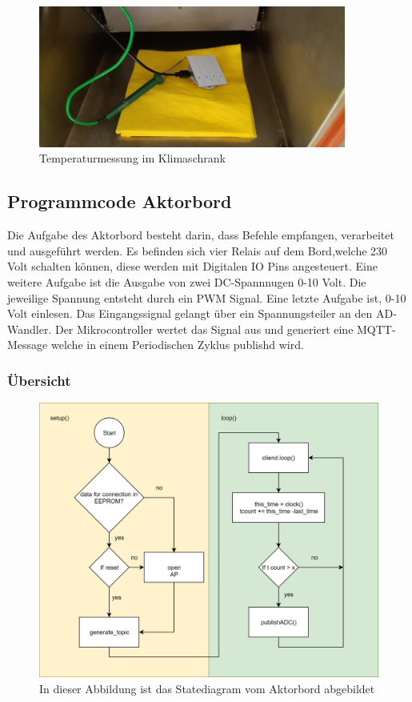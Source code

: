 \begin{figure}[H]
	\centering
	\includegraphics[width=0.90\textwidth]{graphics/Klimaschrank.jpg}
	\caption{Temperaturmessung im Klimaschrank}
	\label{pic: Klimaschrank}
\end{figure}

\newpage
\subsection{Programmcode Aktorbord}
Die Aufgabe des Aktorbord besteht darin, dass Befehle empfangen, verarbeitet und ausgeführt werden. Es befinden sich vier Relais auf dem Bord,welche 230 Volt schalten können, diese werden mit Digitalen IO Pins angesteuert. Eine weitere Aufgabe ist die Ausgabe von zwei DC-Spannnugen 0-10 Volt. Die jeweilige Spannung entsteht durch ein PWM Signal. Eine letzte Aufgabe ist, 0-10 Volt einlesen. Das Eingangssignal gelangt über ein Spannungsteiler an den AD-Wandler. Der Mikrocontroller wertet das Signal aus und generiert eine MQTT-Message welche in einem Periodischen Zyklus publishd wird.    


\subsubsection{	Übersicht} 
\begin{figure}[H]
	\centering
	\includegraphics[width=\textwidth]{graphics/StatemaschineAktor.png}
	\caption{In dieser Abbildung ist das Statediagram vom Aktorbord abgebildet}
	\label{pic: statemaschine Aktor}
\end{figure} 
\newpage

